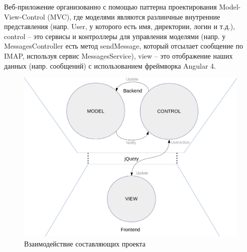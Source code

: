 \documentclass{article}
\begin{document}
Веб-приложение организованно с помощью паттерна проектирования Model-View-Control (MVC), где моделями являются разлинчные внутренние представления (напр. User, у которого есть имя, директории, логин и т.д.), control -- это сервисы и контроллеры для управления моделями (напр. у MessagesController есть метод sendMessage, который отсылает сообщение по IMAP, используя сервис MessagesService), view -- это отображение наших данных (напр. сообщений) с использованием фреймворка Angular 4.

\begin{figure}[H]
        \begin{flushleft}        \centerline{\includegraphics[scale=0.3]{mvc.png}}
        \caption{Взаимодействие составляющих проекта}
        \end{flushleft}
\end{figure}
\end{document}

